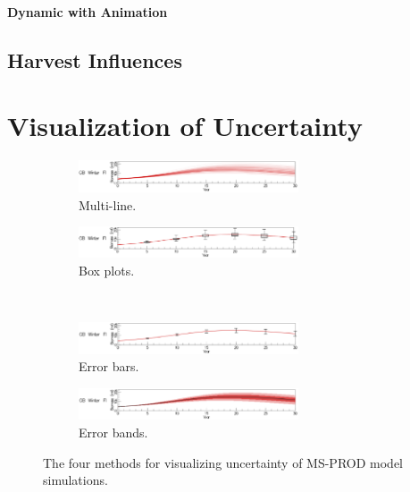 \paragraph{Dynamic with Animation}



\subsection{Harvest Influences}



\section{Visualization of Uncertainty}

\begin{figure}
\centering
	\begin{subfigure}[b]{0.45\textwidth}
		\centering
		\includegraphics[width=6.5cm]{figures/eps/msprod_uncertainty_multline.eps}
		\caption{Multi-line.}
		\label{fig:uncertaintyStreak}
	\end{subfigure}	
	\begin{subfigure}[b]{0.45\textwidth}
		\centering
		\includegraphics[width=6.5cm]{figures/eps/msprod_uncertainty_boxplots.eps}
		\caption{Box plots.}
		\label{fig:uncertaintyBoxplots}
	\end{subfigure} \\
	\begin{subfigure}[b]{0.45\textwidth}
		\centering
		\includegraphics[width=6.5cm]{figures/eps/msprod_uncertainty_errorbar.eps}
		\caption{Error bars.}
		\label{fig:uncertaintyErrorbars}
	\end{subfigure}
	\begin{subfigure}[b]{0.45\textwidth}
		\centering
		\includegraphics[width=6.5cm]{figures/eps/msprod_uncertainty_errorbands.eps}
		\caption{Error bands.}
		\label{fig:uncertaintyErrorbands}
	\end{subfigure}
	\caption{The four methods for visualizing uncertainty of MS-PROD model simulations.}
	\label{fig:uncertainty}
\end{figure}

